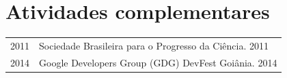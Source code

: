 \documentclass[12pt, oneside, openany, a4paper, english, brazil]{abntex2}
\begin{document}

\section{Atividades complementares}

\begin{tabular}{rl}
    2011 & Sociedade Brasileira para o Progresso da Ciência. 2011 \\
    2014 & Google Developers Group (GDG) DevFest Goiânia. 2014 \\
\end{tabular}

\end{document}

